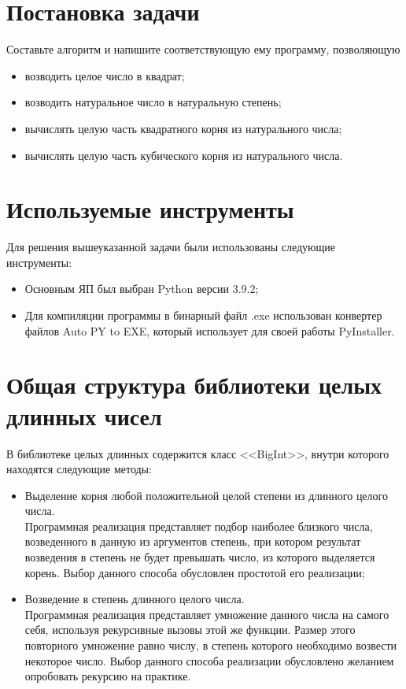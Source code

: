 \section{Постановка задачи}
Составьте алгоритм и напишите соответствующую ему программу, позволяющую
\begin{itemize}
    \item возводить целое число в квадрат;
    \item возводить натуральное число в натуральную степень;
    \item вычислять целую часть квадратного корня из натурального числа;
    \item вычислять целую часть кубического корня из натурального числа.
\end{itemize}


\clearpage
\section{Используемые инструменты}
Для решения вышеуказанной задачи были использованы следующие инструменты:
\begin{itemize}
    \item Основным ЯП был выбран Python версии 3.9.2;
    \item Для компиляции программы в бинарный файл .exe использован конвертер файлов Auto PY to EXE,
    который использует для своей работы PyInstaller.
\end{itemize}


\clearpage
\section{Общая структура библиотеки целых\\длинных чисел}
В библиотеке целых длинных содержится класс <<BigInt>>, внутри которого находятся следующие методы:
\begin{itemize}
    \item Выделение корня любой положительной целой степени из длинного целого числа.\\
    Программная реализация представляет подбор наиболее близкого числа, возведенного в данную из аргументов степень,
    при котором результат возведения в степень не будет превышать число, из которого выделяется корень.
    Выбор данного способа обусловлен простотой его реализации;
    \item Возведение в степень длинного целого числа.\\
    Программная реализация представляет умножение данного числа на самого себя, используя рекурсивные вызовы этой же функции.
    Размер этого повторного умножение равно числу, в степень которого необходимо возвести некоторое число. Выбор
    данного способа реализации обусловлено желанием опробовать рекурсию на практике.
\end{itemize}

